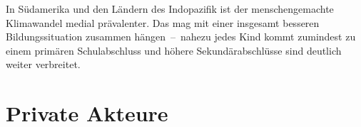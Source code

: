 In Südamerika und den Ländern des Indopazifik ist der menschengemachte Klimawandel medial prävalenter.
Das mag mit einer insgesamt besseren Bildungssituation zusammen hängen~--~nahezu jedes Kind kommt zumindest zu einem primären Schulabschluss und höhere Sekundärabschlüsse sind deutlich weiter verbreitet.


\section{Private Akteure}